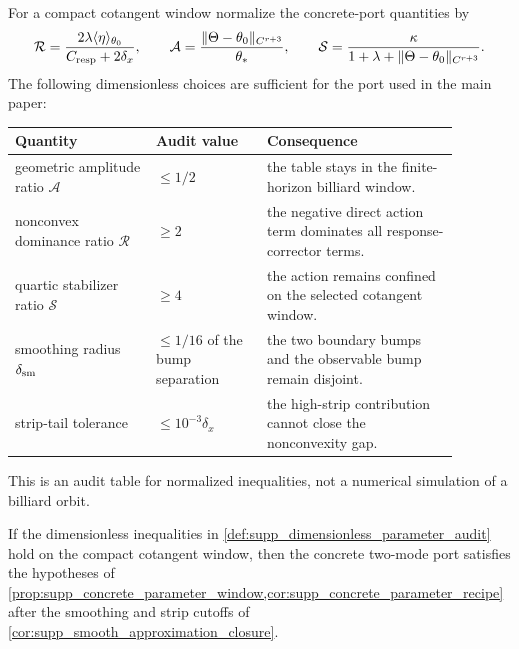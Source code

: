 \begin{definition}
\label{def:supp_dimensionless_parameter_audit}
For a compact cotangent window normalize the concrete-port quantities by
\[
  \mathcal R
  =
  \frac{2\lambda\langle\eta\rangle_{\theta_0}}{C_{\rm resp}+2\delta_x},
  \qquad
  \mathcal A
  =
  \frac{\|\Theta-\theta_0\|_{C^{r+3}}}{\theta_*},
  \qquad
  \mathcal S
  =
  \frac{\kappa}{1+\lambda+\|\Theta-\theta_0\|_{C^{r+3}}}.
\]
The following dimensionless choices are sufficient for the port used in the
main paper:
\begin{center}
\small
\begin{tabular}{p{0.28\linewidth}p{0.22\linewidth}p{0.38\linewidth}}
\hline
Quantity & Audit value & Consequence \\
\hline
geometric amplitude ratio \(\mathcal A\) & \(\le 1/2\) &
the table stays in the finite-horizon billiard window. \\
nonconvex dominance ratio \(\mathcal R\) & \(\ge 2\) &
the negative direct action term dominates all response-corrector terms. \\
quartic stabilizer ratio \(\mathcal S\) & \(\ge 4\) &
the action remains confined on the selected cotangent window. \\
smoothing radius \(\delta_{\rm sm}\) & \(\le 1/16\) of the bump separation &
the two boundary bumps and the observable bump remain disjoint. \\
strip-tail tolerance & \(\le 10^{-3}\delta_x\) &
the high-strip contribution cannot close the nonconvexity gap. \\
\hline
\end{tabular}
\end{center}
This is an audit table for normalized inequalities, not a numerical simulation
of a billiard orbit.
\end{definition}

\begin{proposition}
\label{prop:supp_parameter_audit_verification}
If the dimensionless inequalities in
\cref{def:supp_dimensionless_parameter_audit} hold on the compact cotangent
window, then the concrete two-mode port satisfies the hypotheses of
\cref{prop:supp_concrete_parameter_window,cor:supp_concrete_parameter_recipe}
after the smoothing and strip cutoffs of
\cref{cor:supp_smooth_approximation_closure}.
\end{proposition}

